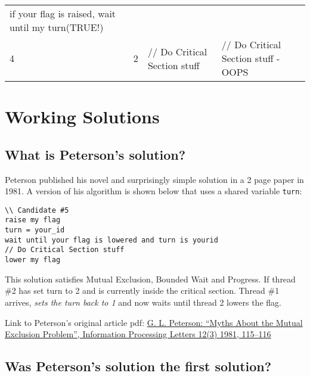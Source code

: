 \begin{longtable}[c]{@{}llll@{}}
\begin{minipage}[t]{0.14\columnwidth}
if your flag is raised, wait until my turn(TRUE!)
\strut\end{minipage}\tabularnewline
\begin{minipage}[t]{0.07\columnwidth}\raggedright\strut
4
\strut\end{minipage} &
\begin{minipage}[t]{0.09\columnwidth}\raggedright\strut
2
\strut\end{minipage} &
\begin{minipage}[t]{0.15\columnwidth}\raggedright\strut
// Do Critical Section stuff
\strut\end{minipage} &
\begin{minipage}[t]{0.14\columnwidth}\raggedright\strut
// Do Critical Section stuff - OOPS
\strut\end{minipage}\tabularnewline
\bottomrule
\end{longtable}

\section{Working Solutions}\label{working-solutions}

\subsection{What is Peterson's
solution?}\label{what-is-petersons-solution}

Peterson published his novel and surprisingly simple solution in a 2
page paper in 1981. A version of his algorithm is shown below that uses
a shared variable \texttt{turn}:

\begin{verbatim}
\\ Candidate #5
raise my flag
turn = your_id
wait until your flag is lowered and turn is yourid
// Do Critical Section stuff
lower my flag
\end{verbatim}

This solution satisfies Mutual Exclusion, Bounded Wait and Progress. If
thread \#2 has set turn to 2 and is currently inside the critical
section. Thread \#1 arrives, \emph{sets the turn back to 1} and now
waits until thread 2 lowers the flag.

Link to Peterson's original article pdf:
\href{http://dl.acm.org/citation.cfm?id=945527}{G. L. Peterson: ``Myths
About the Mutual Exclusion Problem'', Information Processing Letters
12(3) 1981, 115--116}

\subsection{Was Peterson's solution the first
solution?}\label{was-petersons-solution-the-first-solution}

